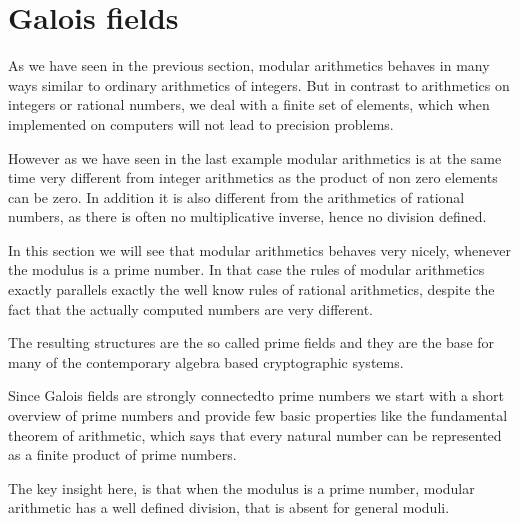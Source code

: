 \section{Galois fields}
As we have seen in the previous section, modular arithmetics behaves in many ways similar to ordinary arithmetics of integers. But in contrast to arithmetics on integers or rational numbers, we deal with a finite set of elements, which when implemented on computers will not lead to precision problems.

However as we have seen in the last example modular arithmetics is at the same time very different from integer arithmetics as the product of non zero elements can be zero. In addition it is also different from the arithmetics of rational numbers, as there is often no multiplicative inverse, hence no division defined. 

In this section we will see that modular arithmetics behaves very nicely, whenever the modulus is a prime number. In that case the rules of modular arithmetics exactly parallels exactly the well know rules of rational arithmetics, despite the fact that the actually computed numbers are very different.

The resulting structures are the so called prime fields and they are the base for many of the contemporary algebra based cryptographic systems.

Since Galois fields are strongly connectedto prime numbers we start with
a short overview of prime numbers and provide few basic properties like the fundamental theorem of arithmetic, which says that every natural number can be represented as a finite product of prime numbers.

The key insight here, is that when the modulus is a prime number, modular arithmetic has a well defined division, that is absent for general moduli.




